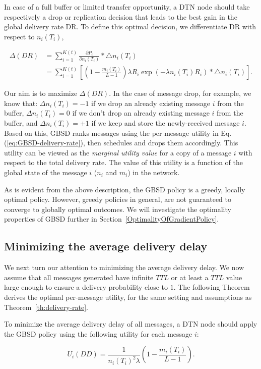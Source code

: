 In case of a full buffer or limited transfer opportunity, a DTN node should take respectively a drop or replication decision that leads to the best gain in the global delivery rate DR. To define this optimal decision, we differentiate DR with respect to $n_i(T_i)$,

\small
\begin{align*}
\Delta(DR) &= \sum_{i=1}^{K(t)}{\frac{\partial P_i}{\partial n_i(T_i)} * \bigtriangleup n_i(T_i)}
\\&= \sum_{i=1}^{K(t)} \left[{(1-\frac{m_i(T_i)}{L-1})\lambda R_i\exp(-\lambda n_i(T_i) R_i) * \bigtriangleup n_i(T_i)}\right].
\end{align*}
\normalsize

Our aim is to maximize $\Delta(DR)$. In the case of message drop, for example, we know that: $\Delta n_i(T_i) = -1$ if we drop an already existing message $i$ from the buffer, $\Delta n_i(T_i) = 0$ if we don't drop an already existing message $i$ from the buffer, and $\Delta n_i(T_i) = +1$ if we keep and store the newly-received message $i$. Based on this, GBSD ranks messages using the per message utility in Eq.(\ref{eq:GBSD-delivery-rate}), then schedules and drops them accordingly. This utility can be viewed as the \emph{marginal utility value} for a copy of a message $i$ with respect to the total delivery rate. The value of this utility is a function of the global state of the message $i$ ($n_i$ and $m_i$) in the network.

As is evident from the above description, the GBSD policy is a greedy, locally optimal policy. However, greedy policies in general, are not guaranteed to converge to globally optimal outcomes. We will investigate the optimality properties of GBSD further in Section~\ref{OptimalityOfGradientPolicy}.

\subsection{Minimizing the average delivery delay}
\label{subsec:MinAvgDeliveryDelay}

We next turn our attention to minimizing the average delivery delay. We now assume that all messages generated have infinite $TTL$ or at least a $TTL$ value large enough to ensure a delivery probability close to $1$. The following Theorem derives the optimal per-message utility, for the same setting and assumptions as Theorem~\ref{th:delivery-rate}.

\begin{theorem} \label{th:delivery-delay}
To minimize the average delivery delay of all messages, a DTN node should apply the GBSD policy using the following utility for each message $i$:

\begin{equation}\label{eq:delivery-delay}
U_{i}(DD) = \frac{1}{n_i(T_i)^2 \lambda} ( 1-\frac{m_i(T_i)}{L-1}). \end{equation}
\end{theorem}

